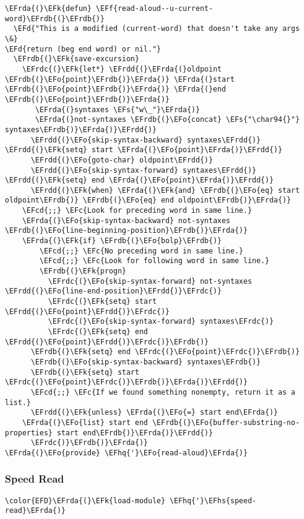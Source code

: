 \documentclass[a4wide,10pt]{article}
\newcommand{\EFc}[1]{\textcolor{EFc}{#1}} %
\newcommand{\EFcd}[1]{\textcolor{EFcd}{#1}} %
\newcommand{\EFs}[1]{\textcolor{EFs}{#1}} %
\newcommand{\EFd}[1]{\textcolor{EFd}{#1}} %
\newcommand{\EFk}[1]{\textcolor{EFk}{#1}} %
\newcommand{\EFf}[1]{\textcolor{EFf}{#1}} %
\newcommand{\EFo}[1]{\textcolor{EFo}{#1}} %
\newcommand{\EFhq}[1]{\textcolor{EFhq}{#1}} %
\newcommand{\EFhs}[1]{\textcolor{EFhs}{#1}} %
\newcommand{\EFrda}[1]{\textcolor{EFrda}{#1}} %
\newcommand{\EFrdb}[1]{\textcolor{EFrdb}{#1}} %
\newcommand{\EFrdc}[1]{\textcolor{EFrdc}{#1}} %
\newcommand{\EFrdd}[1]{\textcolor{EFrdd}{#1}} %
\begin{document}
\begin{Code}
\begin{Verbatim}
\EFrda{(}\EFk{defun} \EFf{read-aloud--u-current-word}\EFrdb{(}\EFrdb{)}
  \EFd{"This is a modified (current-word) that doesn't take any args \&}
\EFd{return (beg end word) or nil."}
  \EFrdb{(}\EFk{save-excursion}
    \EFrdc{(}\EFk{let*} \EFrdd{(}\EFrda{(}oldpoint \EFrdb{(}\EFo{point}\EFrdb{)}\EFrda{)} \EFrda{(}start \EFrdb{(}\EFo{point}\EFrdb{)}\EFrda{)} \EFrda{(}end \EFrdb{(}\EFo{point}\EFrdb{)}\EFrda{)}
	   \EFrda{(}syntaxes \EFs{"w\_"}\EFrda{)}
	   \EFrda{(}not-syntaxes \EFrdb{(}\EFo{concat} \EFs{"\char94{}"} syntaxes\EFrdb{)}\EFrda{)}\EFrdd{)}
      \EFrdd{(}\EFo{skip-syntax-backward} syntaxes\EFrdd{)} \EFrdd{(}\EFk{setq} start \EFrda{(}\EFo{point}\EFrda{)}\EFrdd{)}
      \EFrdd{(}\EFo{goto-char} oldpoint\EFrdd{)}
      \EFrdd{(}\EFo{skip-syntax-forward} syntaxes\EFrdd{)} \EFrdd{(}\EFk{setq} end \EFrda{(}\EFo{point}\EFrda{)}\EFrdd{)}
      \EFrdd{(}\EFk{when} \EFrda{(}\EFk{and} \EFrdb{(}\EFo{eq} start oldpoint\EFrdb{)} \EFrdb{(}\EFo{eq} end oldpoint\EFrdb{)}\EFrda{)}
	\EFcd{;;} \EFc{Look for preceding word in same line.}
	\EFrda{(}\EFo{skip-syntax-backward} not-syntaxes \EFrdb{(}\EFo{line-beginning-position}\EFrdb{)}\EFrda{)}
	\EFrda{(}\EFk{if} \EFrdb{(}\EFo{bolp}\EFrdb{)}
	    \EFcd{;;} \EFc{No preceding word in same line.}
	    \EFcd{;;} \EFc{Look for following word in same line.}
	    \EFrdb{(}\EFk{progn}
	      \EFrdc{(}\EFo{skip-syntax-forward} not-syntaxes \EFrdd{(}\EFo{line-end-position}\EFrdd{)}\EFrdc{)}
	      \EFrdc{(}\EFk{setq} start \EFrdd{(}\EFo{point}\EFrdd{)}\EFrdc{)}
	      \EFrdc{(}\EFo{skip-syntax-forward} syntaxes\EFrdc{)}
	      \EFrdc{(}\EFk{setq} end \EFrdd{(}\EFo{point}\EFrdd{)}\EFrdc{)}\EFrdb{)}
	  \EFrdb{(}\EFk{setq} end \EFrdc{(}\EFo{point}\EFrdc{)}\EFrdb{)}
	  \EFrdb{(}\EFo{skip-syntax-backward} syntaxes\EFrdb{)}
	  \EFrdb{(}\EFk{setq} start \EFrdc{(}\EFo{point}\EFrdc{)}\EFrdb{)}\EFrda{)}\EFrdd{)}
      \EFcd{;;} \EFc{If we found something nonempty, return it as a list.}
      \EFrdd{(}\EFk{unless} \EFrda{(}\EFo{=} start end\EFrda{)}
	\EFrda{(}\EFo{list} start end \EFrdb{(}\EFo{buffer-substring-no-properties} start end\EFrdb{)}\EFrda{)}\EFrdd{)}
      \EFrdc{)}\EFrdb{)}\EFrda{)}
\EFrda{(}\EFo{provide} \EFhq{'}\EFo{read-aloud}\EFrda{)}
\end{Verbatim}
\end{Code}
\subsubsection{Speed Read}
\label{sec:org8b3e118}
\begin{Code}
\begin{Verbatim}
\color{EFD}\EFrda{(}\EFk{load-module} \EFhq{'}\EFhs{speed-read}\EFrda{)}
\end{Verbatim}
\end{Code}
\end{document}
